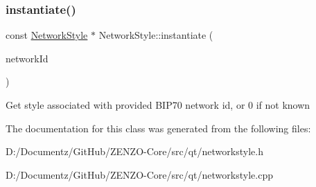 \subsubsection{\texorpdfstring{instantiate()}{instantiate()}}
{\footnotesize\ttfamily const \mbox{\hyperlink{class_network_style}{Network\+Style}} $\ast$ Network\+Style\+::instantiate (\begin{DoxyParamCaption}\item[{const Q\+String \&}]{network\+Id }\end{DoxyParamCaption})\hspace{0.3cm}{\ttfamily [static]}}

Get style associated with provided B\+I\+P70 network id, or 0 if not known 

The documentation for this class was generated from the following files\+:\begin{DoxyCompactItemize}
\item 
D\+:/\+Documentz/\+Git\+Hub/\+Z\+E\+N\+Z\+O-\/\+Core/src/qt/networkstyle.\+h\item 
D\+:/\+Documentz/\+Git\+Hub/\+Z\+E\+N\+Z\+O-\/\+Core/src/qt/networkstyle.\+cpp\end{DoxyCompactItemize}
